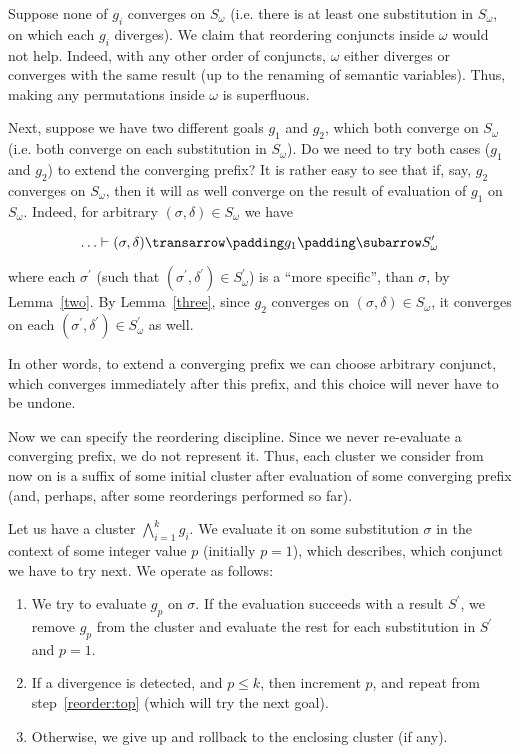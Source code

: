 Suppose none of $g_i$ converges on $S_\omega$ (i.e. there is at least one substitution in $S_\omega$, on which
each $g_i$ diverges). We claim that reordering conjuncts inside $\omega$ would not help. Indeed, with any other order
of conjuncts, $\omega$ either diverges or converges with the same result (up to the renaming of semantic variables). Thus,
making any permutations inside $\omega$ is superfluous.

Next, suppose we have two different goals $g_1$ and $g_2$, which both converge on $S_\omega$ (i.e. both converge on each
substitution in $S_\omega$). Do we need to try both cases ($g_1$ and $g_2$) to extend the converging prefix?
It is rather easy to see that if, say, $g_2$ converges on $S_\omega$, then it will as well converge on the result of evaluation
of $g_1$ on $S_\omega$. Indeed, for arbitrary \mbox{$(\sigma, \delta)\in S_\omega$} we have

\[
\otrans{\dots}{(\sigma, \delta)}{g_1}{S^\prime_\omega}
\]

where each $\sigma^\prime$ (such that \mbox{$(\sigma^\prime, \delta^\prime)\in S^\prime_\omega$}) is a ``more specific'',
than $\sigma$, by Lemma~\ref{two}. By Lemma~\ref{three}, since $g_2$ converges on \mbox{$(\sigma, \delta)\in S_\omega$},
it converges on each \mbox{$(\sigma^\prime, \delta^\prime)\in S^\prime_\omega$} as well.

In other words, to extend a converging prefix we can choose arbitrary conjunct, which converges immediately
after this prefix, and this choice will never have to be undone.

Now we can specify the reordering discipline. Since we never re-evaluate a converging prefix, we do not
represent it. Thus, each cluster we consider from now on is a suffix of some initial cluster after
evaluation of some converging prefix (and, perhaps, after some reorderings performed so far).

Let us have a cluster \mbox{$\bigwedge_{i=1}^k g_i$}. We evaluate it on some substitution $\sigma$ in the context of some integer
value $p$ (initially $p=1$), which describes, which conjunct we have to try next. We operate as follows:

\begin{enumerate}
\item\label{reorder:top} We try to evaluate $g_p$ on $\sigma$. If the evaluation succeeds with a result $S^\prime$, we 
remove $g_p$ from the cluster and evaluate the rest for each substitution in $S^\prime$ and $p=1$.
  
\item If a divergence is detected, and $p\le k$, then increment $p$, and repeat from step~\ref{reorder:top} (which will try the next goal).
  
\item Otherwise, we give up and rollback to the enclosing cluster (if any).
\end{enumerate}

